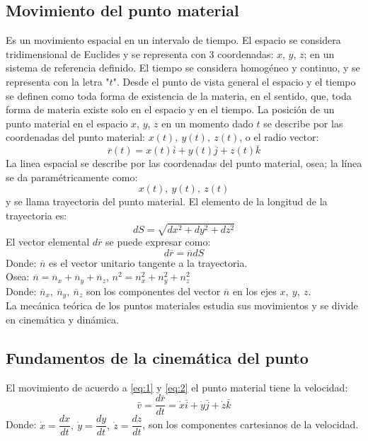 \documentclass[11pt]{article}
\begin{document}
\subsection{Movimiento del punto material}
Es un movimiento espacial en un intervalo de tiempo. El espacio se considera tridimensional de Euclides y se representa con 3 coordenadas: $x$, $y$, $z$; en un sistema de referencia definido. El tiempo se considera homogéneo y continuo, y se representa con la letra "$t$".
Desde el punto de vista general el espacio y el tiempo se definen como toda forma de existencia de la materia, en el sentido, que, toda forma de materia existe solo en el espacio y en el tiempo.
La posición de un punto material en el espacio $x$, $y$, $z$ en un momento dado $t$ se describe por las coordenadas del punto material: $x(t),\ y(t),\ z(t)$, o el radio vector: 
\begin{equation}
    \overline{r} (t) = x(t) \overline{i} + y(t)\overline{j} + z(t)\overline{k} \label{eq:1}
\end{equation}
La linea espacial se describe por las coordenadas del punto material, osea; la línea se da paramétricamente como:
\begin{equation}
    x(t),\ y(t),\ z(t) 	\label{eq:2}
\end{equation}
y se llama trayectoria del punto material.
El elemento de la longitud de la trayectoria es:
\begin{equation}
    dS = \sqrt{dx^2 + dy^2 + dz^2} \label{eq:3}
\end{equation}
El vector elemental $d\overline{r}$  se puede expresar como:
\begin{equation}
    d\overline{r} = \overline{n}dS  \label{eq:4}
\end{equation}
Donde: $\overline{n}$ es el vector unitario tangente a la trayectoria.\\
Osea: $\overline{n} = \overline{n}_x + \overline{n}_y + \overline{n}_z$, $n^2 = n^2_x + n^2_y + n^2_z$\\
Donde: $\overline{n}_x,\ \overline{n}_y,\ \overline{n}_z$ son los componentes del vector $\overline{n}$ en los ejes $x,\ y,\ z$.\\
La mecánica teórica de los puntos materiales estudia sus movimientos y se divide en cinemática y dinámica.
\subsection{Fundamentos de la cinemática del punto}
El movimiento de acuerdo a \eqref{eq:1} y \eqref{eq:2} el punto material tiene la velocidad: 
\begin{equation*}
\bar{v} = \dfrac{d\bar{r}}{dt} = \dot{x}\bar{i} + \dot{y}\bar{j} + \dot{z}\bar{k} 
\end{equation*}
Donde: $\dot{x} = \dfrac{dx}{dt},\ \dot{y} = \dfrac{dy}{dt},\ \dot{z} = \dfrac{dz}{dt}$, son los componentes cartesianos de la velocidad.
\end{document}

